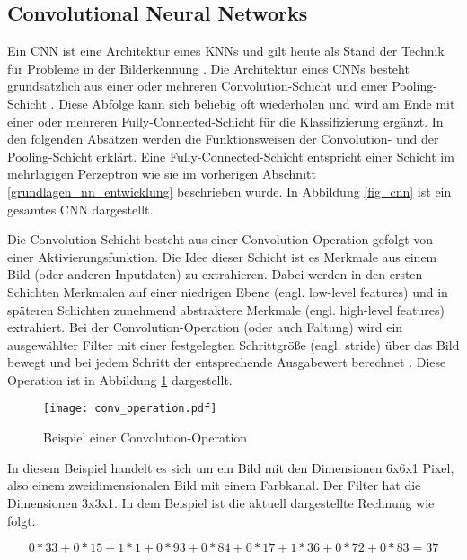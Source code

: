 \subsection{Convolutional Neural Networks}
\label{grundlagen_nn_cnn}

Ein \acf{CNN} ist eine Architektur eines \acp{KNN} und gilt heute als Stand der Technik für Probleme in der Bilderkennung \cite{krizhevsky2012imagenet}. Die Architektur eines \acp{CNN} besteht grundsätzlich aus einer oder mehreren Convolution-Schicht und einer Pooling-Schicht \cite{lecun2010convolutional}. Diese Abfolge kann sich beliebig oft wiederholen und wird am Ende mit einer oder mehreren Fully-Connected-Schicht für die Klassifizierung ergänzt. In den folgenden Absätzen werden die Funktionsweisen der Convolution- und der Pooling-Schicht erklärt. Eine Fully-Connected-Schicht entspricht einer Schicht im mehrlagigen Perzeptron wie sie im vorherigen Abschnitt \ref{grundlagen_nn_entwicklung} beschrieben wurde. In Abbildung \ref{fig_cnn} ist ein gesamtes \ac{CNN} dargestellt.

Die Convolution-Schicht besteht aus einer Convolution-Operation gefolgt von einer Aktivierungsfunktion. Die Idee dieser Schicht ist es Merkmale aus einem Bild (oder anderen Inputdaten) zu extrahieren. Dabei werden in den ersten Schichten Merkmalen auf einer niedrigen Ebene (engl. low-level features) und in späteren Schichten zunehmend abstraktere Merkmale (engl. high-level features) extrahiert. Bei der Convolution-Operation (oder auch Faltung) wird ein ausgewählter Filter mit einer festgelegten Schrittgröße (engl. stride) über das Bild bewegt und bei jedem Schritt der entsprechende Ausgabewert berechnet \cite{lecun1998cnn}. Diese Operation ist in Abbildung \ref{fig_conv_operation} dargestellt.

\begin{figure}[h]
\centering
\texttt{[image: conv\_operation.pdf]}
\caption{Beispiel einer Convolution-Operation}
\label{fig_conv_operation}
\end{figure}

In diesem Beispiel handelt es sich um ein Bild mit den Dimensionen 6x6x1 Pixel, also einem zweidimensionalen Bild mit einem Farbkanal. Der Filter hat die Dimensionen 3x3x1. In dem Beispiel ist die aktuell dargestellte Rechnung wie folgt:

\begin{equation*}
0*33+0*15+1*1+0*93+0*84+0*17+1*36+0*72+0*83=37
\end{equation*}

